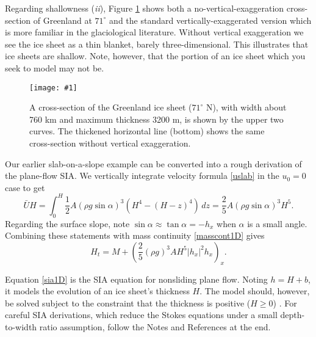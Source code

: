 \documentclass[letterpaper,final,12pt,reqno]{amsart}
\newcommand{\onefigsize}[3]{
\begin{figure}[ht]
\centering
\texttt{[image: \#1]}
\caption{#2}
\label{fig:#1}
\end{figure}}
\begin{document}
Regarding shallowness (\emph{ii}), Figure \ref{fig:green-transect} shows both a no-vertical-exaggeration cross-section of Greenland at $71^\circ$ and the standard vertically-exaggerated version which is more familiar in the glaciological literature.  Without vertical exaggeration we see the ice sheet as a thin blanket, barely three-dimensional.  This illustrates that ice sheets are shallow.  Note, however, that the portion of an ice sheet which you seek to model may not be.

\medskip

\onefigsize{green-transect}{A cross-section of the Greenland ice sheet ($71^\circ$ N), with width about 760 km and maximum thickness 3200 m, is shown by the upper two curves.  The thickened horizontal line (bottom) shows the same cross-section without vertical exaggeration.}{4.0in}

Our earlier slab-on-a-slope example can be converted into a rough derivation of the plane-flow SIA.  We vertically integrate velocity formula \eqref{uslab} in the $u_0=0$ case to get
\begin{equation}
\bar U H = \int_0^H \frac{1}{2} A (\rho g \sin\alpha)^3  \left(H^4 - (H-z)^4\right)\,dz = \frac{2}{5} A (\rho g \sin\alpha)^3 H^5. \label{siaubar}
\end{equation}
Regarding the surface slope, note $\sin \alpha \approx \tan\alpha = - h_x$ when $\alpha$ is a small angle.  Combining these statements with mass continuity \eqref{masscont1D} gives
\begin{equation}
  H_t = M + \left(\frac{2}{5} (\rho g)^3 A H^5 |h_x|^2 h_x\right)_x. \label{sia1D}
\end{equation}

Equation \eqref{sia1D} is the SIA equation for nonsliding plane flow.  Noting $h=H+b$, it models the evolution of an ice sheet's thickness $H$.  The model should, however, be solved subject to the constraint that the thickness is positive ($H\ge 0$) \cite{Bueler2016,JouvetBueler2012}.  For careful SIA derivations, which reduce the Stokes equations under a small depth-to-width ratio assumption, follow the Notes and References at the end.
\end{document}
